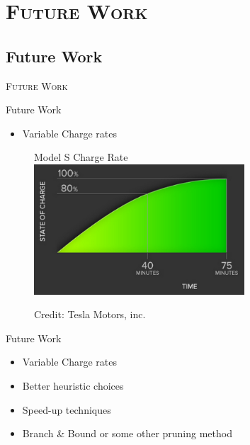 \section{\scshape Future Work}
\subsection{Future Work}

\begin{frame}
\center \huge \scshape Future Work
\end{frame}

\begin{frame}{Future Work}
\begin{itemize}
\item Variable Charge rates
\end{itemize}
\begin{figure}[h!]
  \centering
  Model S Charge Rate
    \includegraphics[width=0.7\textwidth]{images/chargerate}
  
      \tiny Credit: Tesla Motors, inc.
\end{figure}
\vspace{10cm}
\end{frame}

\begin{frame}{Future Work}
\begin{itemize}
\item Variable Charge rates
\item Better heuristic choices
\item Speed-up techniques
\item Branch \& Bound or some other pruning method
\end{itemize}
\vspace{10cm}
\end{frame}

